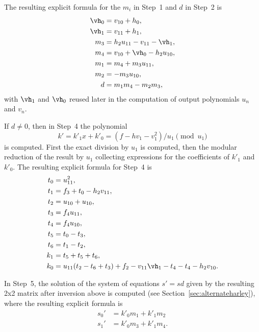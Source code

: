 The resulting explicit formula for the $m_i$ in Step~1 and $d$ in Step~2 is 
\begin{align*}
    \vh_0 &= v_{10} + h_0, \\
    \vh_1 &= v_{11} + h_1,\\
    m_3 &= h_2u_{11} - v_{11} - \vh_1,\\
    m_4 &= v_{10} + \vh_0 - h_2u_{10},\\ 
    m_1 &= m_4 + m_3u_{11},\\
    m_2 &= -m_3u_{10}, \\
    d &= m_1m_4 - m_2m_3,
\end{align*} with $\vh_1$ and $\vh_0$ reused later in the computation of output
polynomials $u_n$ and $v_n$.

If $d \neq 0$, then in Step~4 the polynomial $$k' = k'_1x + k'_0 = (f- hv_1 -
v_1^2)/u_1 \pmod{u_1}$$ is computed. First the exact division by $u_1$ is
computed, then the modular reduction of the result by $u_1$ collecting
expressions for the coefficients of $k'_1$ and $k'_0$. The resulting explicit
formula for Step~4 is
\begin{align*}
    t_0 &= u_{11}^2,\\
    t_1 &= f_3 + t_0 - h_2v_{11},\\
    t_2 &= u_{10} + u_{10},\\
    t_3 &= f_4u_{11},\\
    t_4 &= f_4u_{10},\\
    t_5 &= t_0 - t_3,\\
    t_6 &= t_1 - t_2,\\
    k_1 &= t_5 + t_5 + t_6,\\
    k_0 &= u_{11}(t_2 - t_6 + t_3) + f_2 - v_{11}\vh_1 - t_4 - t_4 - h_2v_{10}.
\end{align*}

In Step~5, the solution of the system of equations $s' = sd$ given by the
resulting 2x2 matrix after inversion above is computed (see
Section~\ref{sec:alternateharley}), where the resulting explicit formula is
\begin{align*}
s_0' &= k'_0m_1 + k'_1m_2\\
s_1' &= k'_0m_3 + k'_1m_4.
\end{align*}
    
